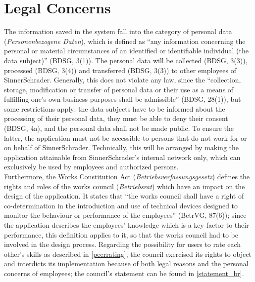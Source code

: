 \newpage

\section{Legal Concerns}
\label{legal_concerns}
The information saved in the system fall into the category of personal data (\textit{Personenbezogene Daten}), which is defined as ``any information concerning the personal or material circumstances of an identified or identifiable individual (the data subject)'' (BDSG, 3(1)). The personal data will be collected (BDSG, 3(3)), processed (BDSG, 3(4)) and transferred (BDSG, 3(3)) to other employees of SinnerSchrader.
Generally, this does not violate any law, since the ``collection, storage, modification or transfer of personal data or their use as a means of fulfilling one’s own business purposes shall be admissible'' (BDSG, 28(1)), but some restrictions apply: the data subjects have to be informed about the processing of their personal data, they must be able to deny their consent (BDSG, 4a), and the personal data shall not be made public.
To ensure the latter, the application must not be accessible to persons that do not work for or on behalf of SinnerSchrader. Technically, this will be arranged by making the application attainable from SinnerSchrader's internal network only, which can exclusively be used by employees and authorized persons.\\
Furthermore, the Works Constitution Act (\textit{Betriebsverfassungsgesetz}) defines the rights and roles of the works council (\textit{Betriebsrat}) which have an impact on the design of the application. It states that ``the works council shall have a right of co-determination in the introduction and use of technical devices designed to monitor the behaviour or performance of the employees'' (BetrVG, 87(6)); since the application describes the employees' knowledge which is a key factor to their performance, this definition applies to it, so that the works council had to be involved in the design process.
Regarding the possibility for users to rate each other's skills as described in \ref{peerrating}, the council exercised its rights to object and interdicts its implementation because of both legal reasons and the personal concerns of employees; the council's statement can be found in \ref{statement_br}.
